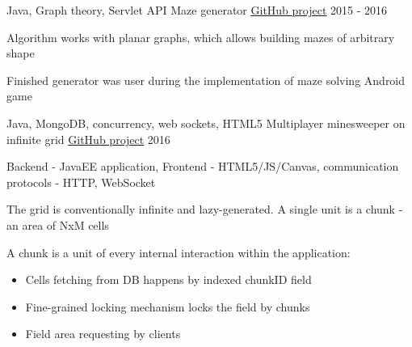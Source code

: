 

\begin{cventries}

  \cventry
    {Java, Graph theory, Servlet API}
    {Maze generator}
    {\color{awesome-skyblue}\href{https://github.com/zhukovsd/maze-generator}{\underline{GitHub project}}}
    {2015 - 2016}
    {
      \begin{cvitems} %
        \item {}
        \item {Algorithm works with planar graphs, which allows building mazes of arbitrary shape}
        \item Finished generator was user during the implementation of maze solving Android game
      \end{cvitems}
    }

  \cventry
    {Java, MongoDB, concurrency, web sockets, HTML5}
    {Multiplayer minesweeper on infinite grid}
    {\color{awesome-skyblue}\href{https://github.com/zhukovsd/endless-field}{\underline{GitHub project}}}
    {2016}
    {
      \begin{cvitems} %
        \item {}
        \item {Backend - JavaEE application, Frontend - HTML5/JS/Canvas, communication protocols - HTTP, WebSocket}
        \item {The grid is conventionally infinite and lazy-generated. A single unit is a chunk - an area of NxM cells}
        \item A chunk is a unit of every internal interaction within the application:
        \begin{itemize}
			\item Cells fetching from DB happens by indexed chunkID field
			\item Fine-grained locking mechanism locks the field by chunks
            \item Field area requesting by clients
		\end{itemize}
      \end{cvitems}
    }
    

\end{cventries}
